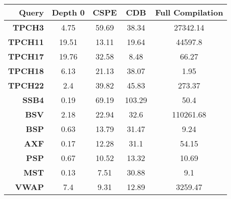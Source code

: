 \begin{tabular}{|r|c|c|c|c|}\hline 
Query & Depth 0 & CSPE & CDB & Full Compilation\\ \hline 
{\bf TPCH3} & 4.75 & 59.69 & 38.34 & 27342.14\\ \hline 
{\bf TPCH11} & 19.51 & 13.11 & 19.64 & 44597.8\\ \hline 
{\bf TPCH17} & 19.76 & 32.58 & 8.48 & 66.27\\ \hline 
{\bf TPCH18} & 6.13 & 21.13 & 38.07 & 1.95\\ \hline 
{\bf TPCH22} & 2.4 & 39.82 & 45.83 & 273.37\\ \hline 
{\bf SSB4} & 0.19 & 69.19 & 103.29 & 50.4\\ \hline 
{\bf BSV} & 2.18 & 22.94 & 32.6 & 110261.68\\ \hline 
{\bf BSP} & 0.63 & 13.79 & 31.47 & 9.24\\ \hline 
{\bf AXF} & 0.17 & 12.28 & 31.1 & 54.15\\ \hline 
{\bf PSP} & 0.67 & 10.52 & 13.32 & 10.69\\ \hline 
{\bf MST} & 0.13 & 7.51 & 30.88 & 9.1\\ \hline 
{\bf VWAP} & 7.4 & 9.31 & 12.89 & 3259.47\\ \hline 
\end{tabular}